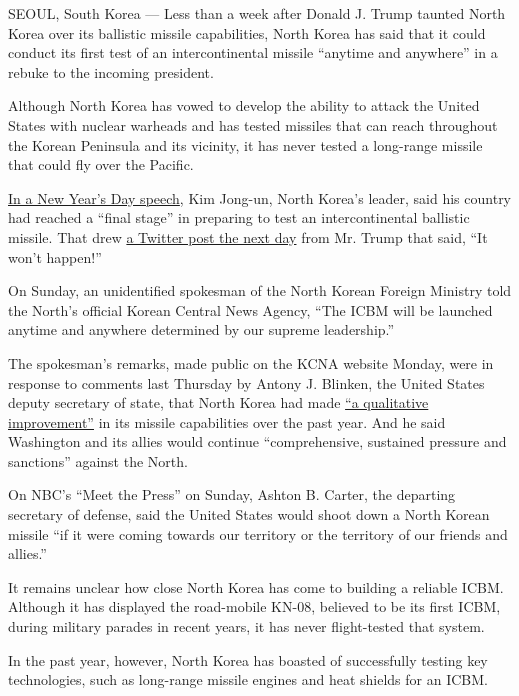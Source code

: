 SEOUL, South Korea --- Less than a week after Donald J. Trump taunted
North Korea over its ballistic missile capabilities, North Korea has
said that it could conduct its first test of an intercontinental missile
``anytime and anywhere'' in a rebuke to the incoming president.

Although North Korea has vowed to develop the ability to attack the
United States with nuclear warheads and has tested missiles that can
reach throughout the Korean Peninsula and its vicinity, it has never
tested a long-range missile that could fly over the Pacific.

\href{http://www.nytimes.com/2017/01/01/world/asia/north-korea-intercontinental-ballistic-missile-test-kim-jong-un.html}{In
a New Year's Day speech}, Kim Jong-un, North Korea's leader, said his
country had reached a ``final stage'' in preparing to test an
intercontinental ballistic missile. That drew
\href{http://www.nytimes.com/2017/01/02/world/asia/trump-twitter-north-korea-missiles-china.html}{a
Twitter post the next day} from Mr. Trump that said, ``It won't
happen!''

On Sunday, an unidentified spokesman of the North Korean Foreign
Ministry told the North's official Korean Central News Agency, ``The
ICBM will be launched anytime and anywhere determined by our supreme
leadership.''

The spokesman's remarks, made public on the KCNA website Monday, were in
response to comments last Thursday by Antony J. Blinken, the United
States deputy secretary of state, that North Korea had made
\href{https://www.state.gov/s/d/2017d/266602.htm}{``a qualitative
improvement''} in its missile capabilities over the past year. And he
said Washington and its allies would continue ``comprehensive, sustained
pressure and sanctions'' against the North.

On NBC's ``Meet the Press'' on Sunday, Ashton B. Carter, the departing
secretary of defense, said the United States would shoot down a North
Korean missile ``if it were coming towards our territory or the
territory of our friends and allies.''

It remains unclear how close North Korea has come to building a reliable
ICBM. Although it has displayed the road-mobile KN-08, believed to be
its first ICBM, during military parades in recent years, it has never
flight-tested that system.

In the past year, however, North Korea has boasted of successfully
testing key technologies, such as long-range missile engines and heat
shields for an ICBM.

